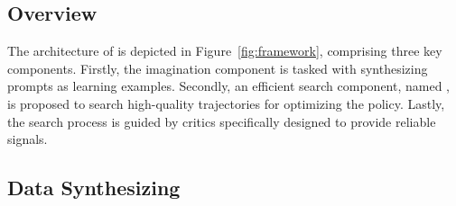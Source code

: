 












\subsection{Overview}

The architecture of \model{} is depicted in Figure~\ref{fig:framework}, comprising three key components. Firstly, the imagination component is tasked with synthesizing prompts as learning examples. Secondly, an efficient search component, named \emcts{}, is proposed to search high-quality trajectories for optimizing the policy. Lastly, the search process is guided by critics specifically designed to provide reliable signals.

\subsection{Data Synthesizing}

